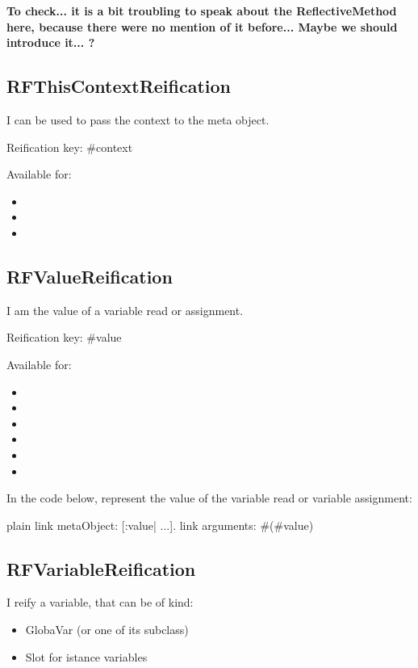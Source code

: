 \documentclass[10pt,twoside,english]{_support/latex/sbabook/sbabook}
\begin{document}
\textbf{To check... it is a bit troubling to speak about the ReflectiveMethod here, because there were no mention of it before... Maybe we should introduce it... ?}
\subsection{RFThisContextReification}
I can be used to pass the context to the meta object.

Reification key: \#context

Available for:

\begin{itemize}
\item {}
\item {}
\item {}
\end{itemize}
\subsection{RFValueReification}
I am the value of a variable read or assignment.

Reification key: \#value

Available for:

\begin{itemize}
\item {}
\item {}
\item {}
\item {}
\item {}
\item {}
\end{itemize}

In the code below,  represent the value of the variable read or variable assignment:

\begin{displaycode}{plain}
link metaObject: [:value| ...].
link arguments: #(#value)
\end{displaycode}
\subsection{RFVariableReification}
I reify a variable, that can be of kind:

\begin{itemize}
\item GlobaVar (or one of its subclass) 
\item Slot for istance variables 
\end{itemize}
\end{document}
